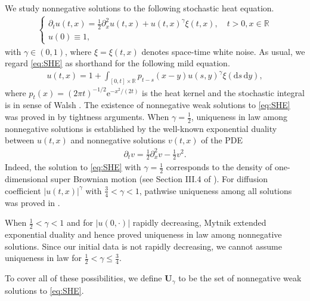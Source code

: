 \documentclass[12pt, reqno]{amsart}
\newcommand{\red}[1]{{\color{red}{#1}}}
\newcommand{\R}{{\mathbb{R}}}
\renewcommand{\d}{\mathrm{d}}
\newcommand{\<}{\langle}
\renewcommand{\>}{\rangle}
\newcommand{\e}{\mathrm{e}}
\begin{document}
We study nonnegative solutions to the following stochastic 
heat equation.
\begin{align}\label{eq:SHE}
\begin{cases}
\partial_tu(t,x)=\frac12\partial_x^2u(t,x)+ u(t,x)^\gamma \xi(t,x), \quad t>0, x\in \R\\
u(0)\equiv1,
\end{cases}
\end{align}
with $\gamma\in (0, 1)$, where $\xi=\xi(t,x)$ denotes space-time 
white noise.  As usual, we regard \eqref{eq:SHE} as shorthand for the 
following mild equation.  
\begin{align}\label{eq:mild}
u(t,x)= 1+ \int_{[0,t]\times\R}p_{t-s}(x-y)u(s,y)^\gamma \xi(\d s\, \d y),
\end{align}
where $p_t(x)= (2\pi t)^{-1/2}\e^{-x^2/(2t)}$ is the heat kernel and the stochastic integral is in sense of Walsh \cite{Wal86}.  The 
existence of nonnegative weak solutions to \eqref{eq:SHE} was proved in 
\cite{MP92, Shi94} by tightness arguments.  When $\gamma=\frac12$, 
uniqueness in law among nonnegative solutions is established by the well-known exponential duality 
between $u(t,x)$ and nonnegative solutions $v(t,x)$ of the PDE
\begin{align*}
\partial_t v=\frac12 \partial_x^2v -\frac12 v^2.
\end{align*}
Indeed, the solution to \eqref{eq:SHE} with $\gamma=\frac12$ corresponds 
to the density of one-dimensional super Brownian motion (see Section III.4 
of \cite{Per02}).  For diffusion coefficient $|u(t,x)|^\gamma$ with $\frac34 <\gamma <1$, pathwise uniqueness among 
all solutions was proved in \cite{MP11}.


When $\frac12 <\gamma <1$ and for $|u(0,\cdot)|$ rapidly decreasing,  
Mytnik \cite{Myt98} extended exponential duality and hence proved 
uniqueness in law among nonnegative solutions.  Since our initial data is 
not rapidly decreasing, we cannot assume uniqueness in law for 
$\frac{1}{2}<\gamma\le\frac{3}{4}$.

To cover all of these possibilities, we define $\mathbf{U}_\gamma$ to be 
the set of nonnegative weak solutions to \eqref{eq:SHE}.  
\end{document}
